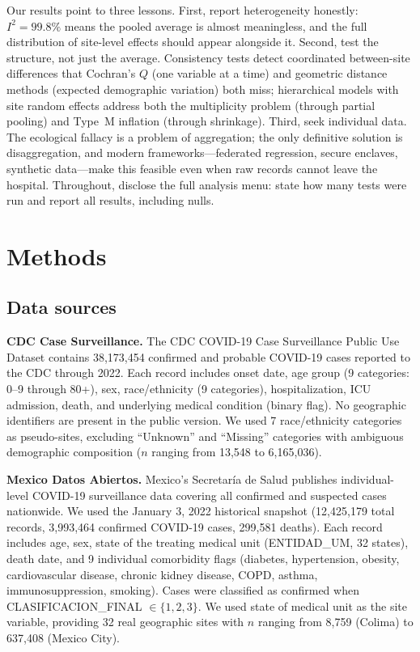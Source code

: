 \documentclass[11pt]{article}
\begin{document}
Our results point to three lessons.  First, report heterogeneity honestly:
$I^2 = 99.8\%$ means the pooled average is almost meaningless, and the
full distribution of site-level effects should appear alongside it.
Second, test the structure, not just the average.  Consistency tests detect
coordinated between-site differences that Cochran's $Q$ (one variable at a
time) and geometric distance methods (expected demographic variation) both
miss; hierarchical models with site random effects address both the
multiplicity problem (through partial pooling) and Type~M inflation
(through shrinkage).  Third, seek individual data.  The ecological fallacy
is a problem of aggregation; the only definitive solution is
disaggregation, and modern frameworks---federated regression, secure
enclaves, synthetic data---make this feasible even when raw records cannot
leave the hospital.  Throughout, disclose the full analysis menu: state how
many tests were run and report all results, including nulls.


\section{Methods}

\subsection{Data sources}

\textbf{CDC Case Surveillance.}  The CDC COVID-19 Case Surveillance Public
Use Dataset contains 38,173,454 confirmed and probable COVID-19 cases reported
to the CDC through 2022.  Each record includes onset date, age group (9
categories: 0--9 through 80+), sex, race/ethnicity (9 categories),
hospitalization, ICU admission, death, and underlying medical condition (binary
flag).  No geographic identifiers are present in the public version.  We used
7 race/ethnicity categories as pseudo-sites, excluding ``Unknown'' and
``Missing'' categories with ambiguous demographic composition ($n$ ranging
from 13,548 to 6,165,036).

\textbf{Mexico Datos Abiertos.}  Mexico's Secretar\'{i}a de Salud publishes
individual-level COVID-19 surveillance data covering all confirmed and
suspected cases nationwide.  We used the January 3, 2022 historical snapshot
(12,425,179 total records, 3,993,464 confirmed COVID-19 cases, 299,581
deaths).  Each record includes age, sex, state of the treating medical unit
(ENTIDAD\_UM, 32 states), death date, and 9 individual comorbidity flags
(diabetes, hypertension, obesity, cardiovascular disease, chronic kidney
disease, COPD, asthma, immunosuppression, smoking).  Cases were classified as
confirmed when CLASIFICACION\_FINAL $\in \{1, 2, 3\}$.  We used state of
medical unit as the site variable, providing 32 real geographic sites with
$n$ ranging from 8,759 (Colima) to 637,408 (Mexico City).
\end{document}
